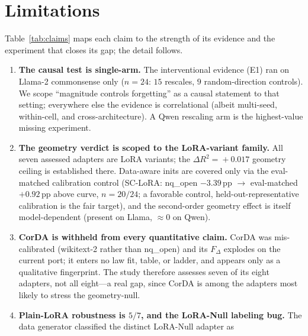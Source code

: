 \documentclass[11pt]{article}
\newcommand{\dw}{F_{\Delta}}
\begin{document}
\section*{Limitations}\label{sec:limitations}
Table~\ref{tab:claims} maps each claim to the strength of its evidence and the
experiment that closes its gap; the detail follows.



\begin{enumerate}
  \item \textbf{The causal test is single-arm.} The interventional evidence (E1)
        ran on Llama-2 commonsense only ($n\!=\!24$: $15$ rescales, $9$
        random-direction controls). We scope ``magnitude controls forgetting'' as
        a causal statement to that setting; everywhere else the evidence is
        correlational (albeit multi-seed, within-cell, and cross-architecture). A
        Qwen rescaling arm is the highest-value missing experiment.
  \item \textbf{The geometry verdict is scoped to the LoRA-variant family.} All
        seven assessed adapters are LoRA variants; the $\Delta R^2\!=\!+0.017$
        geometry ceiling is established there. Data-aware inits are covered only
        via the eval-matched calibration control (SC-LoRA: nq\_open $-3.39$\,pp
        $\to$ eval-matched $+0.92$\,pp above curve, $n\!=\!20/24$; a favorable
        control, held-out-representative calibration is the fair target), and the
        second-order geometry effect is itself model-dependent (present on Llama,
        $\approx\!0$ on Qwen).
  \item \textbf{CorDA is withheld from every quantitative claim.} CorDA was
        mis-calibrated (wikitext-2 rather than nq\_open) and its $\dw$ explodes on
        the current port; it enters no law fit, table, or ladder, and appears only
        as a qualitative fingerprint. The study therefore assesses seven of its
        eight adapters, not all eight---a real gap, since CorDA is among the
        adapters most likely to stress the geometry-null.
  \item \textbf{Plain-LoRA robustness is $5/7$, and the LoRA-Null labeling bug.}
        The data generator classified the distinct LoRA-Null adapter as

\end{enumerate}
\end{document}
